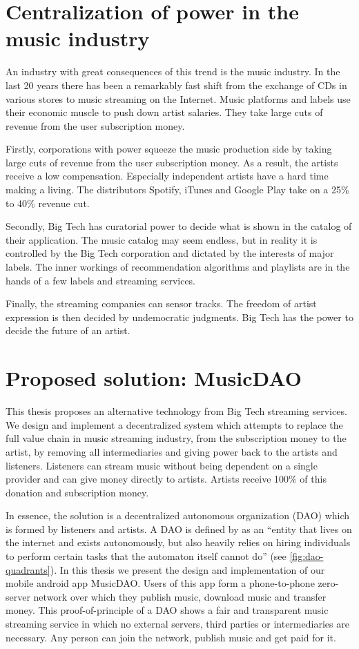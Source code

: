 \section{Centralization of power in the music industry}
An industry with great consequences of this trend is the music industry. In the last 20 years there has been a remarkably fast shift from the exchange of CDs in various stores to music streaming on the Internet. Music platforms and labels use their economic muscle to push down artist salaries. They take large cuts of revenue from the user subscription money.

Firstly, corporations with power squeeze the music production side by taking large cuts of revenue from the user subscription money. As a result, the artists receive a low compensation. Especially independent artists have a hard time making a living. The distributors Spotify, iTunes and Google Play take on a 25\% to 40\% revenue cut.

Secondly, Big Tech has curatorial power to decide what is shown in the catalog of their application. The music catalog may seem endless, but in reality it is controlled by the Big Tech corporation and dictated by the interests of major labels. The inner workings of recommendation algorithms and playlists are in the hands of a few labels and streaming services.

Finally, the streaming companies can sensor tracks. The freedom of artist expression is then decided by undemocratic judgments. Big Tech has the power to decide the future of an artist.

\section{Proposed solution: MusicDAO}
This thesis proposes an alternative technology from Big Tech streaming services. We design and implement a decentralized system which attempts to replace the full value chain in music streaming industry, from the subscription money to the artist, by removing all intermediaries and giving power back to the artists and listeners. Listeners can stream music without being dependent on a single provider and can give money directly to artists. Artists receive 100\% of this donation and subscription money.

In essence, the solution is a decentralized autonomous organization (DAO) which is formed by listeners and artists. A DAO is defined by \cite{buterin2014dao} as an ``entity that lives on the internet and exists autonomously, but also heavily relies on hiring individuals to perform certain tasks that the automaton itself cannot do'' (see \ref{fig:dao-quadrants}). In this thesis we present the design and implementation of our mobile android app MusicDAO. Users of this app form a phone-to-phone zero-server network over which they publish music, download music and transfer money. This proof-of-principle of a DAO shows a fair and transparent music streaming service in which no external servers, third parties or intermediaries are necessary. Any person can join the network, publish music and get paid for it. 

